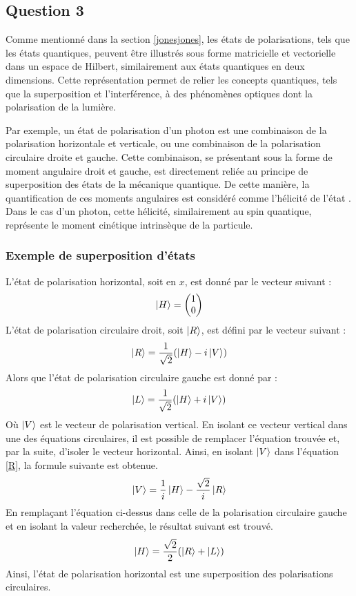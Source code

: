 \documentclass[11pt,letterpaper]{article}
\begin{document}
\subsection{Question 3}
Comme mentionné dans la section \ref{jonesjones}, les états de polarisations, tels que les états quantiques, peuvent être illustrés sous forme matricielle et vectorielle dans un espace de Hilbert, similairement aux états quantiques en deux dimensions. Cette représentation permet de relier les concepts quantiques, tels que la superposition et l'interférence, à des phénomènes optiques dont la polarisation de la lumière. 

Par exemple, un état de polarisation d'un photon est une combinaison de la polarisation horizontale et verticale, ou une combinaison de la polarisation circulaire droite et gauche. Cette combinaison, se présentant sous la forme de moment angulaire droit et gauche, est directement reliée au principe de superposition des états de la mécanique quantique. De cette manière, la quantification de ces moments angulaires est considéré comme l'hélicité de l'état \cite{noauthor_spin_2005}. Dans le cas d'un photon, cette hélicité, similairement au spin quantique, représente le moment cinétique intrinsèque de la particule.

\subsubsection{Exemple de superposition d'états}
L'état de polarisation horizontal, soit en $x$, est donné par le vecteur suivant :
\begin{equation}
  \ket{H}=
  \begin{pmatrix}
    1 \\
    0 \\
  \end{pmatrix}
\end{equation}
L'état de polarisation circulaire droit, soit $\ket{R}$, est défini par le vecteur suivant :
\begin{equation}
  \ket{R}=\frac{1}{\sqrt{2}}(\ket{H}-i\ket{V})
  \label{R}
\end{equation}
Alors que l'état de polarisation circulaire gauche est donné par :
\begin{equation}
  \ket{L}=\frac{1}{\sqrt{2}}(\ket{H}+i\ket{V})
\end{equation}
Où $\ket{V}$ est le vecteur de polarisation vertical. En isolant ce vecteur vertical dans une des équations circulaires, il est possible de remplacer l'équation trouvée et, par la suite, d'isoler le vecteur horizontal. Ainsi, en isolant $\ket{V}$ dans l'équation \ref{R}, la formule suivante est obtenue.
\begin{equation}
  \ket{V}=\frac{1}{i}\ket{H}-\frac{\sqrt{2}}{i}\ket{R}
\end{equation}
En remplaçant l'équation ci-dessus dans celle de la polarisation circulaire gauche et en isolant la valeur recherchée, le résultat suivant est trouvé.
\begin{equation}
  \ket{H}=\frac{\sqrt{2}}{2}(\ket{R}+\ket{L})
\end{equation}
Ainsi, l'état de polarisation horizontal est une superposition des polarisations circulaires.
\end{document}
